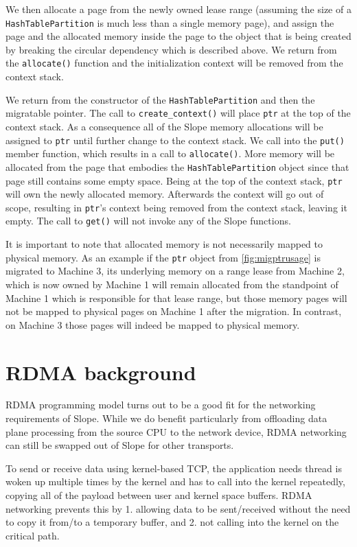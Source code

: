 We then allocate a page from the newly owned lease range (assuming the size of
a \texttt{HashTablePartition} is much less than a single memory page), and assign the
page and the allocated memory inside the page to the object that is being
created by breaking the circular dependency which is described above.
We return from the \texttt{allocate()} function and the initialization context
will be removed from the context stack.

We return from the constructor of the \texttt{HashTablePartition} and then
the migratable pointer. The call to \texttt{create\_context()} will place
\texttt{ptr} at the top of the context stack. As a consequence all of the
Slope memory allocations will be assigned to \texttt{ptr} until further change
to the context stack. We call into the \texttt{put()} member function, which
results in a call to \texttt{allocate()}. More memory will be allocated from
the page that embodies the \texttt{HashTablePartition} object since that page
still contains some empty space. Being at the top of the context stack,
\texttt{ptr} will own the newly allocated memory. Afterwards the context will
go out of scope, resulting in \texttt{ptr}'s context being removed from the
context stack, leaving it empty. 
The call to \texttt{get()} will not invoke any of the Slope functions.

It is important to note that allocated memory is not necessarily mapped to
physical memory. As an example if the \texttt{ptr} object from
\autoref{fig:migptrusage} is migrated to Machine 3, its underlying memory
on a range lease from Machine 2, which is now owned by Machine 1 will remain
allocated from the standpoint of Machine 1 which is responsible for that lease
range, but those memory pages will not be mapped to physical pages on Machine 1
after the migration.
In contrast, on Machine 3 those pages will indeed be mapped to
physical memory.

\section{RDMA background}
RDMA programming model turns out to be a good fit for the networking
requirements of Slope. While we do benefit particularly from
offloading data plane processing from the source CPU to the network device,
RDMA networking can still be swapped out of Slope for other transports.

To send or receive data using kernel-based TCP, the application needs thread
is woken up multiple times by the kernel and has to call into the kernel
repeatedly, copying all of the payload between user and kernel space buffers.
RDMA networking prevents this by 1. allowing data to be sent/received without
the need to copy it from/to a temporary buffer, and 2. not calling into the
kernel on the critical path.

